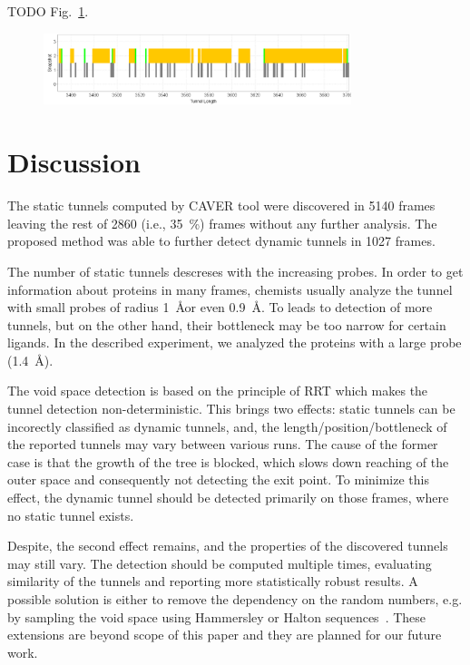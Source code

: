 \documentclass[usletter, 10pt, conference]{svjour3}      %
\begin{document}
TODO Fig.~\ref{fig::caver34}.

\begin{figure}
\centering
\includegraphics[width=0.8\textwidth]{fig/caver3450-3700}
\caption{\label{fig::caver34}
}
\end{figure}




\section{Discussion}

The static tunnels computed by CAVER tool were discovered in 5140 frames leaving the rest of 2860 (i.e., 35~\%) 
frames without any further analysis.
The proposed method was able to further detect dynamic tunnels in 1027 frames.


The number of static tunnels descreses with the increasing probes. 
In order to get information about proteins in many frames, chemists usually analyze the tunnel with small probes of radius
1~\AA or even 0.9~\AA.
To leads to detection of more tunnels, but on the other hand, their bottleneck may be too narrow for certain ligands.
In the described experiment, we analyzed the proteins with a large probe (1.4~\AA).

The void space detection is based on the principle of RRT which makes the tunnel detection non-deterministic.
This brings two effects: static tunnels can be incorectly classified as dynamic tunnels, and, the length/position/bottleneck of 
the reported tunnels may vary between various runs.
The cause of the former case is that the growth of the tree is blocked, which slows down reaching of the outer space and consequently not detecting the exit point.
To minimize this effect, the dynamic tunnel should be detected primarily on those frames, where no static tunnel exists.

Despite, the second effect remains, and the properties of the discovered tunnels may still vary.
The detection should be computed multiple times, evaluating similarity of the tunnels and reporting more statistically robust results.
A possible solution is either to remove the dependency on the random numbers, e.g. by sampling the void space
 using Hammersley or Halton sequences~\cite{Lav06,branickyQuasi,rosell2007general}.
These extensions are beyond scope of this paper and they are planned for our future work.
\end{document}
